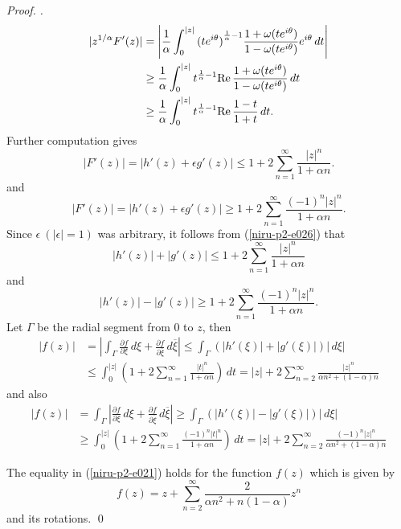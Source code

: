 \documentclass[a4paper,12pt]{amsart}
\theoremstyle{plain}
\theoremstyle{definition}
\newenvironment{pf}[1][]{ \vskip 3mm
 \noindent
 \ifthenelse{\equal{#1}{}}  {{\slshape Proof. }}  {{\slshape #1.} } }{\qed\bigskip}
\begin{document}
\begin{pf}
\begin{align*}
|z^{1/ \alpha} F'(z)|&=\left|\frac{1}{\alpha}\int_{0}^{|z|}{(t e^{i \theta})}^{\frac{1}{\alpha} -1}\frac{1 +\omega(t e^{i\theta})}{1-\omega(t e^{i \theta})} e^{i\theta}\,dt \right|\\
&\geq \frac{1}{\alpha}\int_{0}^{|z|}t^{\frac{1}{\alpha} -1}{\rm Re\,}\frac{1 +\omega(t e^{i\theta})}{1-\omega(t e^{i \theta})}\,dt\\
& \geq \frac{1}{\alpha}\int_{0}^{|z|}t^{\frac{1}{\alpha} -1}{\rm Re\,}\frac{1 - t}{1+t}\,dt.
\end{align*}
Further computation gives
\begin{equation}\label{niru-p2-e026}
|F'(z)| = |h'(z) + \epsilon g'(z)|  \leq 1 + 2 \sum_{n =1}^{\infty}\frac{|z|^n}{1 + \alpha n}.
\end{equation}
and
\begin{equation*}
|F'(z)| = |h'(z) + \epsilon g'(z)|  \geq 1 + 2 \sum_{n =1}^{\infty}\frac{(-1)^n |z|^n}{1 + \alpha n}.
\end{equation*}
Since $\epsilon~ (|\epsilon|=1)$ was arbitrary, it follows from (\ref{niru-p2-e026}) that 
\begin{equation*}\label{niru-p2-e030}
|h'(z)| +  |g'(z)| \leq 1 + 2 \sum_{n =1}^{\infty}\frac{|z|^n}{1 + \alpha n}
\end{equation*}
and
\begin{equation*}\label{niru-p2-e030}
|h'(z)| -  |g'(z)| \geq 1 + 2 \sum_{n =1}^{\infty}\frac{(-1)^n|z|^n}{1 + \alpha n}.
\end{equation*}
\noindent Let $\Gamma$ be the radial segment from $0$ to $z$, then
\begin{align*}
|f(z)| &= \left|\int_{\Gamma}\frac{\partial f}{\partial \xi}\, d\xi + \frac{\partial f}{\partial {\overline{\xi}}} \, d\overline{\xi} \right| \leq \int_{\Gamma}(|h'(\xi)| + |g'(\xi)|)|\,d\xi|\\
& \leq \int_{0}^{|z|} \left(1 + 2 \sum_{n =1}^{\infty}\frac{|t|^n}{1 + \alpha n} \right)\, dt = |z| + 2 \sum _{n = 2}^{\infty}\frac{|z|^n}{\alpha n^2 + (1 - \alpha)n}
\end{align*}
and also
\begin{align*}
|f(z)| &= \int_{\Gamma}\left|\frac{\partial f}{\partial \xi}\, d\xi + \frac{\partial f}{\partial {\overline{\xi}}} \, d\overline{\xi} \right| \geq \int_{\Gamma}(|h'(\xi)| - |g'(\xi)|)|\,d\xi|\\
& \geq \int_{0}^{|z|} \left(1 + 2 \sum_{n =1}^{\infty}\frac{(-1)^n|t|^n}{1 + \alpha n} \right)\, dt = |z| + 2 \sum _{n = 2}^{\infty}\frac{(-1)^n|z|^n}{\alpha n^2 + (1 - \alpha)n}
\end{align*}

\noindent The equality in (\ref{niru-p2-e021}) holds for the function $f(z)$ which is given by 
$$f(z) = z + \sum _{n = 2}^{\infty}\frac{2}{\alpha n^2 + n(1 - \alpha)}z^n
$$ 
and its rotations.
\end{pf}
\end{document}
